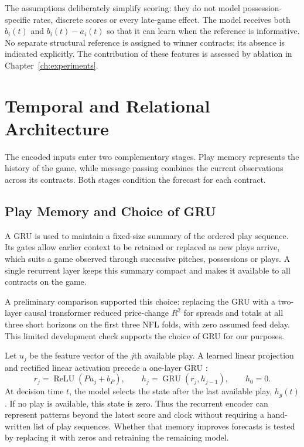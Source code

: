 \documentclass[12pt,a4paper,oneside]{report}
\begin{document}
The assumptions deliberately simplify scoring: they do not model possession-
specific rates, discrete scores or every late-game effect. The model receives
both $b_i(t)$ and $b_i(t)-a_i(t)$ so that it can learn when the reference is
informative. No separate structural reference is assigned to winner contracts;
its absence is indicated explicitly. The contribution of these features is
assessed by ablation in Chapter~\ref{ch:experiments}.

\section{Temporal and Relational Architecture}\label{sec:ingame-arch}
The encoded inputs enter two complementary stages. Play memory represents the
history of the game, while message passing combines the current observations
across its contracts. Both stages condition the forecast for each contract.

\subsection{Play Memory and Choice of GRU}
A GRU is used to maintain a fixed-size summary of the ordered play sequence.
Its gates allow earlier context to be retained or replaced as new plays arrive,
which suits a game observed through successive pitches, possessions or plays.
A single recurrent layer keeps this summary compact and makes it available to
all contracts on the game.

A preliminary comparison supported this choice: replacing the GRU with a
two-layer causal transformer \citep{vaswani2017attention} reduced price-change
$R^2$ for spreads and totals at all three short horizons on the first three NFL
folds, with zero assumed feed delay. This limited development check supports
the choice of GRU for our purposes.

Let $u_j$ be the feature vector of the $j$th available play. A learned linear
projection and rectified linear activation precede a one-layer GRU
\citep{cho2014learning}:
\begin{equation}
 r_j=\operatorname{ReLU}(P u_j+b_P),\qquad
 h_j=\operatorname{GRU}(r_j,h_{j-1}),\qquad h_0=0.
\end{equation}
At decision time $t$, the model selects the state after the last available play,
$h_g(t)$. If no play is available, this state is zero. Thus the recurrent encoder
can represent patterns beyond the latest score and clock without requiring a
hand-written list of play sequences. Whether that memory improves forecasts is
tested by replacing it with zeros and retraining the remaining model.
\end{document}
